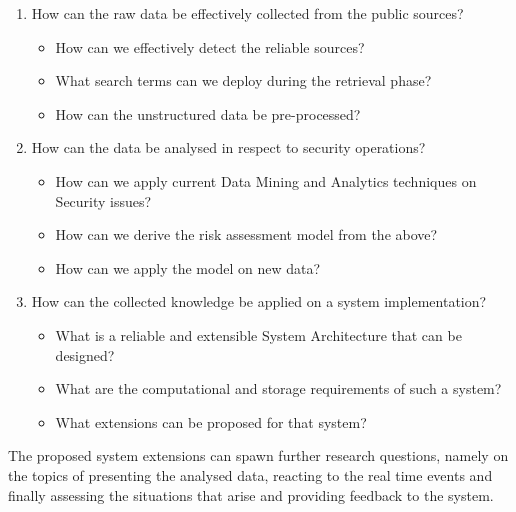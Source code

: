 \documentclass[12pt]{article}
\begin{document}
\begin{enumerate}
	\item How can the raw data be effectively collected from the public sources? 
	\begin{itemize}
		\item How can we effectively detect the reliable sources?
		\item What search terms can we deploy during the retrieval phase?
		\item How can the unstructured data be pre-processed? 
	\end{itemize}
	\item How can the data be analysed in respect to security operations?
	\begin{itemize}
		\item How can we apply current Data Mining and Analytics techniques on Security issues?
		\item How can we derive the risk assessment model from the above?
		\item How can we apply the model on new data?
	\end{itemize}
	\item	How can the collected knowledge be applied on a system implementation?
	\begin{itemize}
		\item What is a reliable and extensible System Architecture that can be designed?
		\item What are the computational and storage requirements of such a system?
		\item What extensions can be proposed for that system?
	\end{itemize}
\end{enumerate}

The proposed system extensions can spawn further research questions, namely on the topics of presenting the analysed data, reacting to the real time events and finally assessing the situations that arise and providing feedback to the system.
\end{document}
